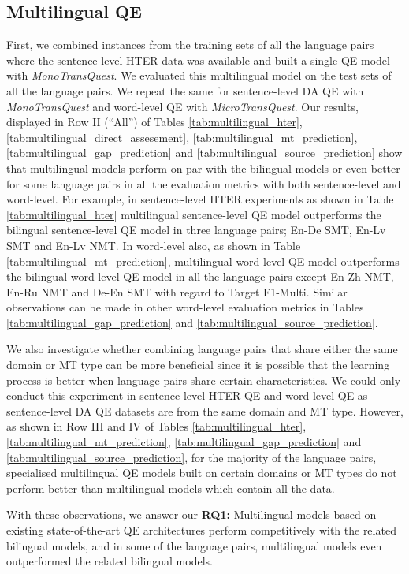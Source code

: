\subsection{Multilingual QE}
First, we combined instances from the training sets of all the language pairs where the sentence-level HTER data was available and built a single QE model with \textit{MonoTransQuest}. We evaluated this multilingual model on the test sets of all the language pairs. We repeat the same for sentence-level DA QE with \textit{MonoTransQuest} and word-level QE with \textit{MicroTransQuest}. 
Our results, displayed in Row II (``All'') of Tables \ref{tab:multilingual_hter}, \ref{tab:multilingual_direct_assesement}, \ref{tab:multilingual_mt_prediction}, \ref{tab:multilingual_gap_prediction} and \ref{tab:multilingual_source_prediction} show that multilingual models perform on par with the bilingual models or even better for some language pairs in all the evaluation metrics with both sentence-level and word-level. For example, in sentence-level HTER experiments as shown in Table \ref{tab:multilingual_hter}  multilingual sentence-level QE model outperforms the bilingual sentence-level QE model in three language pairs; En-De SMT, En-Lv SMT and En-Lv NMT. In word-level also, as shown in Table \ref{tab:multilingual_mt_prediction}, multilingual word-level QE model outperforms the bilingual word-level QE model in all the language pairs except En-Zh NMT, En-Ru NMT and De-En SMT with regard to Target F1-Multi. Similar observations can be made in other word-level evaluation metrics in Tables  \ref{tab:multilingual_gap_prediction} and \ref{tab:multilingual_source_prediction}. 

We also investigate whether combining language pairs that share either the same domain or MT type can be more beneficial since it is possible that the learning process is better when language pairs share certain characteristics. We could only conduct this experiment in sentence-level HTER QE and word-level QE as sentence-level DA QE datasets are from the same domain and MT type. However, as shown in Row III and IV of Tables \ref{tab:multilingual_hter}, \ref{tab:multilingual_mt_prediction}, \ref{tab:multilingual_gap_prediction} and \ref{tab:multilingual_source_prediction}, for the majority of the language pairs, specialised multilingual  QE models built on certain domains or MT types do not perform better than multilingual models which contain all the data.

With these observations, we answer our \textbf{RQ1:} Multilingual models based on existing state-of-the-art QE architectures perform competitively with the related bilingual models, and in some of the language pairs, multilingual models even outperformed the related bilingual models. 

